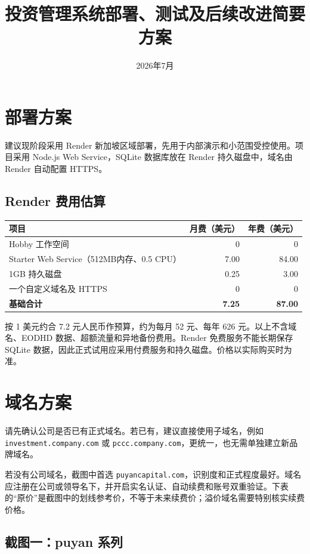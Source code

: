 \documentclass[11pt,a4paper]{ctexart}
\title{\textbf{投资管理系统部署、测试及后续改进简要方案}}
\author{}
\date{2026年7月}
\begin{document}
\maketitle

\section{部署方案}

建议现阶段采用 Render 新加坡区域部署，先用于内部演示和小范围受控使用。项目采用 Node.js Web Service，SQLite 数据库放在 Render 持久磁盘中，域名由 Render 自动配置 HTTPS。

\subsection*{Render 费用估算}

\begin{tabularx}{\textwidth}{@{}Yrr@{}}
\toprule
项目 & 月费（美元） & 年费（美元） \\
\midrule
Hobby 工作空间 & 0 & 0 \\
Starter Web Service（512MB内存、0.5 CPU） & 7.00 & 84.00 \\
1GB 持久磁盘 & 0.25 & 3.00 \\
一个自定义域名及 HTTPS & 0 & 0 \\
\midrule
\textbf{基础合计} & \textbf{7.25} & \textbf{87.00} \\
\bottomrule
\end{tabularx}

\vspace{0.5em}
按 1 美元约合 7.2 元人民币作预算，约为每月 52 元、每年 626 元。以上不含域名、EODHD 数据、超额流量和异地备份费用。Render 免费服务不能长期保存 SQLite 数据，因此正式试用应采用付费服务和持久磁盘。价格以实际购买时为准。

\section{域名方案}

请先确认公司是否已有正式域名。若已有，建议直接使用子域名，例如
\texttt{investment.company.com} 或 \texttt{pccc.company.com}，更统一，也无需单独建立新品牌域名。

若没有公司域名，截图中首选 \texttt{puyancapital.com}，识别度和正式程度最好。域名应注册在公司或领导名下，并开启实名认证、自动续费和账号双重验证。下表的“原价”是截图中的划线参考价，不等于未来续费价；溢价域名需要特别核实续费价格。

\subsection*{截图一：puyan 系列}
\end{document}
